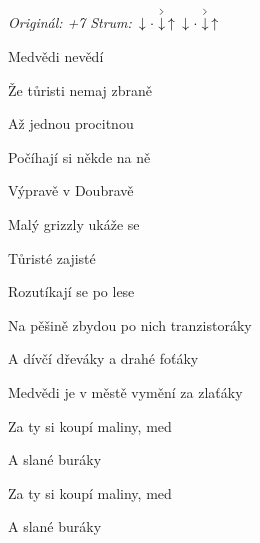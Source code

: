 \begin{song}


\begin{headerbox}
\RaiseBoxWithAccents
\textit{Originál: +7} \quad
\textit{Strum:} $\Down\Miss\AccentDown\Up\ \Down\Miss\AccentDown\Up$
\end{headerbox}

\begin{hchordbox}
\end{hchordbox}

\Large

\bigskip

Medvědi nevědí \par
{}Že tůristi nemaj zbraně \par
{}Až jednou procitnou \par
{}Počíhají si někde na ně \par

\bigskip

Výpravě v Doubravě \par
{}Malý grizzly ukáže se \par
{}Tůristé zajisté \par
{}Rozutíkají se po lese \par

\bigskip

Na pěšině zbydou po nich tranzistoráky  \par
A dívčí dřeváky  a drahé foťáky  \par

\bigskip

Medvědi je v městě vymění za zlaťáky \par
{}Za ty si koupí maliny, med  \par
A slané buráky  \par
{}Za ty si koupí maliny, med  \par
A slané buráky \par

\end{song}
